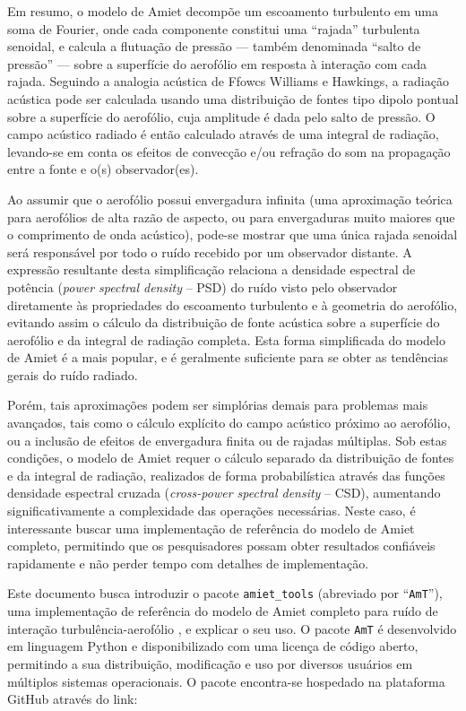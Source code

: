 \documentclass[a4paper, 11pt, twoside]{article}
\newcommand{\AmT}{\texttt{AmT}}
\begin{document}
Em resumo, o modelo de Amiet decompõe um escoamento turbulento em uma soma de Fourier, onde cada componente constitui uma ``rajada'' turbulenta senoidal, e calcula a flutuação de pressão --- também denominada ``salto de pressão'' --- sobre a superfície do aerofólio em resposta à interação com cada rajada. Seguindo a analogia acústica de Ffowcs Williams e Hawkings, a radiação acústica pode ser calculada usando uma distribuição de fontes tipo dipolo pontual sobre a superfície do aerofólio, cuja amplitude é dada pelo salto de pressão. O campo acústico radiado é então calculado através de uma integral de radiação, levando-se em conta os efeitos de convecção e/ou refração do som na propagação entre a fonte e o(s) observador(es).

Ao assumir que o aerofólio possui envergadura infinita (uma aproximação teórica para aerofólios de alta razão de aspecto, ou para envergaduras muito maiores que o comprimento de onda acústico), pode-se mostrar que uma única rajada senoidal será responsável por todo o ruído recebido por um observador distante. A expressão resultante desta simplificação relaciona a densidade espectral de potência (\emph{power spectral density} -- PSD) do ruído visto pelo observador diretamente às propriedades do escoamento turbulento e à geometria do aerofólio, evitando assim o cálculo da distribuição de fonte acústica sobre a superfície do aerofólio e da integral de radiação completa. Esta forma simplificada do modelo de Amiet é a mais popular, e é geralmente suficiente para se obter as tendências gerais do ruído radiado. 

Porém, tais aproximações podem ser simplórias demais para problemas mais avançados, tais como o cálculo explícito do campo acústico próximo ao aerofólio, ou a inclusão de efeitos de envergadura finita ou de rajadas múltiplas. Sob estas condições, o modelo de Amiet requer o cálculo separado da distribuição de fontes e da integral de radiação, realizados de forma probabilística através das funções densidade espectral cruzada (\emph{cross-power spectral density} -- CSD), aumentando significativamente a complexidade das operações necessárias. Neste caso, é interessante buscar uma implementação de referência do modelo de Amiet completo, permitindo que os pesquisadores possam obter resultados confiáveis rapidamente e não perder tempo com detalhes de implementação.

Este documento busca introduzir o pacote \verb|amiet_tools| (abreviado por ``\AmT{}''), uma implementação de referência do modelo de Amiet completo para ruído de interação turbulência-aerofólio \cite{Casagrande_etal2020}, e explicar o seu uso. O pacote \AmT{} é desenvolvido em linguagem Python e disponibilizado com uma licença de código aberto, permitindo a sua distribuição, modificação e uso por diversos usuários em múltiplos sistemas operacionais. O pacote encontra-se hospedado na plataforma GitHub através do link:
\end{document}
